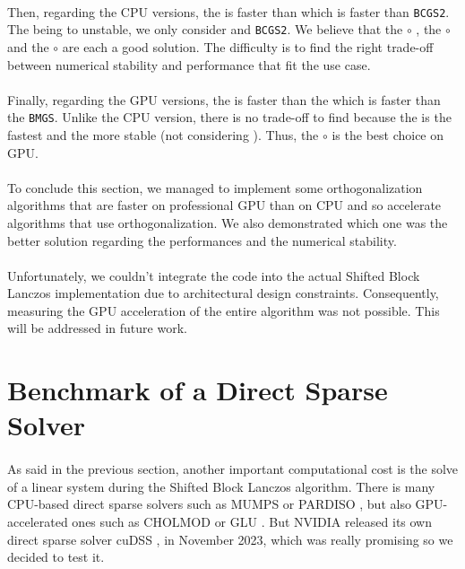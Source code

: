\paragraph*{}
Then, regarding the CPU versions, the \bcgs is faster than \bmgs which is faster than \texttt{BCGS2}. The \bcgs being to unstable, we only consider \bmgs and \texttt{BCGS2}. We believe that the \bmgs $\circ$ \cgsi, the \bcgsi $\circ$ \mgs and the \bcgsi $\circ$ \cgsi are each a good solution. The difficulty is to find the right trade-off between numerical stability and performance that fit the use case.

\paragraph*{}
Finally, regarding the GPU versions, the \bcgs is faster than the \bcgsi which is faster than the \texttt{BMGS}. Unlike the CPU version, there is no trade-off to find because the \bcgsi is the fastest and the more stable (not considering \bcgs). Thus, the \bcgsi $\circ$ \cgsi is the best choice on GPU.

\paragraph*{}
To conclude this section, we managed to implement some orthogonalization algorithms that are faster on professional GPU than on CPU and so accelerate algorithms that use orthogonalization. We also demonstrated which one was the better solution regarding the performances and the numerical stability.

\paragraph*{}
Unfortunately, we couldn't integrate the code into the actual Shifted Block Lanczos implementation due to architectural design constraints. Consequently, measuring the GPU acceleration of the entire algorithm was not possible. This will be addressed in future work.







\newpage
\section{Benchmark of a Direct Sparse Solver}\label{seq:cudss}
\paragraph*{}
As said in the previous section, another important computational cost is the solve of a linear system during the Shifted Block Lanczos algorithm. There is many CPU-based direct sparse solvers such as MUMPS \cite{Mumps2001} or PARDISO \cite{Pardiso2000}, but also GPU-accelerated ones such as CHOLMOD \cite{CHOLMOD2008} or GLU \cite{GLU2019}. But NVIDIA released its own direct sparse solver cuDSS \cite{cuDSS}, in November 2023, which was really promising so we decided to test it.

